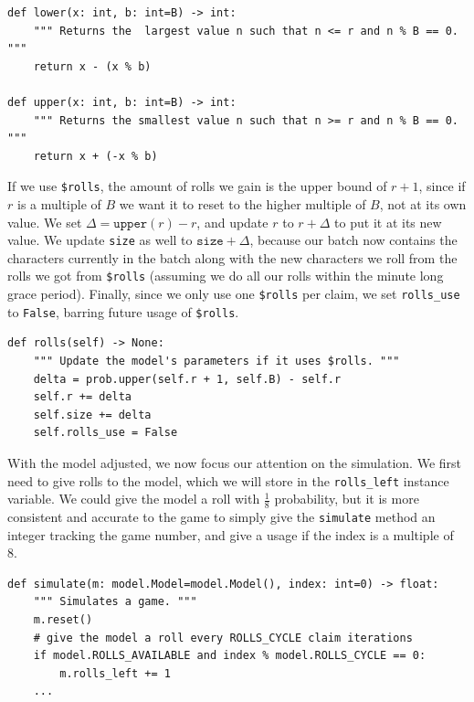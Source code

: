 \documentclass[11pt, oneside]{article}
\theoremstyle{plain}
\theoremstyle{definition}
\begin{document}
\begin{verbatim}
def lower(x: int, b: int=B) -> int:
    """ Returns the  largest value n such that n <= r and n % B == 0. """
    return x - (x % b)

def upper(x: int, b: int=B) -> int:
    """ Returns the smallest value n such that n >= r and n % B == 0. """
    return x + (-x % b)
\end{verbatim}

If we use \texttt{\$rolls}, the amount of rolls we gain is the upper bound of
\( r + 1 \), since if \( r \) is a multiple of \( B \) we want it to reset
to the higher multiple of \( B \), not at its own value. We set \( \Delta =
\texttt{upper}(r) - r \), and update \( r \) to \( r + \Delta \) to put it at
its new value. We update \texttt{size} as well to \( \texttt{size} + \Delta
\), because our batch now contains the characters currently in the batch along
with the new characters we roll from the rolls we got from \texttt{\$rolls}
(assuming we do all our rolls within the minute long grace period). Finally,
since we only use one \texttt{\$rolls} per claim, we set \texttt{rolls\_use}
to \texttt{False}, barring future usage of \texttt{\$rolls}.

\begin{verbatim}
def rolls(self) -> None:
    """ Update the model's parameters if it uses $rolls. """
    delta = prob.upper(self.r + 1, self.B) - self.r
    self.r += delta
    self.size += delta
    self.rolls_use = False
\end{verbatim}

With the model adjusted, we now focus our attention on the simulation.
We first need to give rolls to the model, which we will store in the
\texttt{rolls\_left} instance variable. We could give the model a roll with
\( \frac{1}{8} \) probability, but it is more consistent and accurate to
the game to simply give the \texttt{simulate} method an integer tracking
the game number, and give a usage if the index is a multiple of 8.
\begin{verbatim}
def simulate(m: model.Model=model.Model(), index: int=0) -> float:
    """ Simulates a game. """
    m.reset()
    # give the model a roll every ROLLS_CYCLE claim iterations
    if model.ROLLS_AVAILABLE and index % model.ROLLS_CYCLE == 0:
        m.rolls_left += 1
    ...
\end{verbatim}
\end{document}
